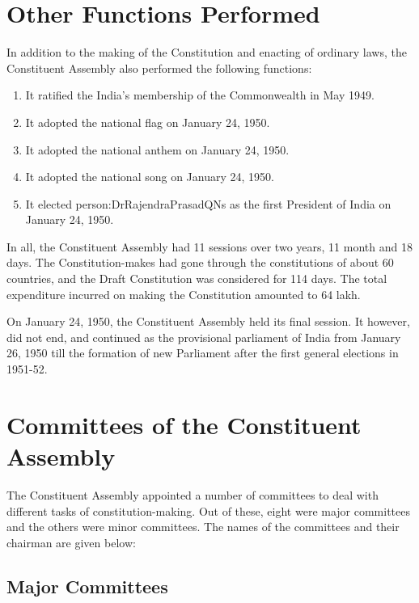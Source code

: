 \section{Other Functions Performed}

In addition to the making of the Constitution and enacting of ordinary laws, the Constituent Assembly also performed the following functions:

\begin{enumerate}
  \item It ratified the India's membership of the Commonwealth in May 1949.
  \item It adopted the national flag on January 24, 1950.
  \item It adopted the national anthem on January 24, 1950.
  \item It adopted the national song on January 24, 1950.
  \item It elected \gls{person:DrRajendraPrasadQNs} as the first President of India on January 24, 1950.
\end{enumerate}

In all, the Constituent Assembly had 11 sessions over two years, 11 month and 18 days. The Constitution-makes had gone through the constitutions of about 60 countries, and the Draft Constitution was considered for 114 days. The total expenditure incurred on making the Constitution amounted to 64 lakh.

On January 24, 1950, the Constituent Assembly held its final session. It however, did not end, and continued as the provisional parliament of India from January 26, 1950 till the formation of new Parliament after the first general elections in 1951-52.

\section{Committees of the Constituent Assembly}

The Constituent Assembly appointed a number of committees to deal with different tasks of constitution-making. Out of these, eight were major committees and the others were minor committees. The names of the committees and their chairman are given below:

\subsection{Major Committees}

